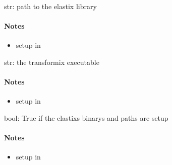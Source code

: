 \documentclass[letterpaper,10pt,english]{sphinxmanual}
\begin{document}

\begin{fulllineitems}
\label{api/ClearMap.Alignment:ClearMap.Alignment.Elastix.ElastixLib}
str: path to the elastix library
\paragraph{Notes}
\begin{itemize}
\item {} 
setup in {\hyperref[api/ClearMap.Alignment:ClearMap.Alignment.Elastix.initializeElastix]{\emph{}}}

\end{itemize}

\end{fulllineitems}


\begin{fulllineitems}
\label{api/ClearMap.Alignment:ClearMap.Alignment.Elastix.TransformixBinary}
str: the transformix executable
\paragraph{Notes}
\begin{itemize}
\item {} 
setup in {\hyperref[api/ClearMap.Alignment:ClearMap.Alignment.Elastix.initializeElastix]{\emph{}}}

\end{itemize}

\end{fulllineitems}


\begin{fulllineitems}
\label{api/ClearMap.Alignment:ClearMap.Alignment.Elastix.Initialized}
bool: True if the elastixs binarys and paths are setup
\paragraph{Notes}
\begin{itemize}
\item {} 
setup in {\hyperref[api/ClearMap.Alignment:ClearMap.Alignment.Elastix.initializeElastix]{\emph{}}}

\end{itemize}

\end{fulllineitems}
\end{document}
